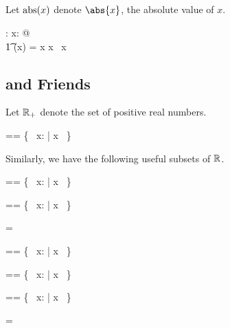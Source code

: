 \documentclass{amsart}
\begin{document}
\subsection{}

Let $\operatorname{abs}(x)$ denote $\abs{x}$, the absolute value of $x$.

\begin{axdef}
	\absR: \R \fun \R
\where
	\forall x: \R @ \\
	\t1	\absR(x) = \IF x \geR \zeroR \THEN x \ELSE \negR~x
\end{axdef}

\subsection{ and Friends}

Let $\mathbb{R}_{+}$ denote the set of positive real numbers.

\begin{zed}
	\Rpos == \{~ x: \R | x \gtR \zeroR ~\}
\end{zed}

Similarly, we have the following useful subsets of $\mathbb{R}$.

\begin{zed}
	\Rneg == \{~ x: \R | x \ltR \zeroR ~\}
\end{zed}

\begin{zed}
	\Rltz == \{~ x: \R | x \ltR \zeroR ~\}
\end{zed}

\begin{remark}
\begin{zed}
	\Rltz = \Rneg
\end{zed}
\end{remark}

\begin{zed}
	\Rlez == \{~ x: \R | x \leR \zeroR ~\}
\end{zed}

\begin{zed}
	\Rgez == \{~ x: \R | x \geR \zeroR ~\}
\end{zed}

\begin{zed}
	\Rgtz == \{~ x: \R | x \gtR \zeroR ~\}
\end{zed}

\begin{remark}
\begin{zed}
	\Rgtz = \Rpos
\end{zed}
\end{remark}
\end{document}

